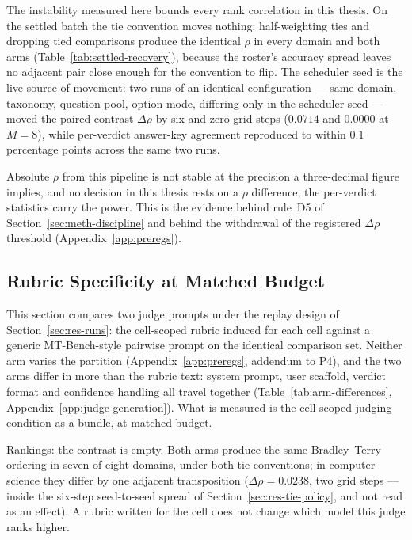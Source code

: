 The instability measured here bounds every rank correlation in this
thesis. On the settled batch the tie convention moves nothing: half-weighting
ties and dropping tied comparisons produce the identical $\rho$ in
every domain and both arms (Table~\ref{tab:settled-recovery}), because
the roster's accuracy spread leaves no adjacent pair close enough for
the convention to flip. The scheduler seed is the live source of
movement: two runs of an identical configuration --- same domain,
taxonomy, question pool, option mode, differing only in the scheduler
seed --- moved the paired contrast $\Delta\rho$ by six and zero grid
steps ($0.0714$ and $0.0000$ at $M = 8$), while per-verdict answer-key
agreement reproduced to within $0.1$ percentage points across the same
two runs.

Absolute $\rho$ from this pipeline is not stable at
the precision a three-decimal figure implies, and no decision in this
thesis rests on a $\rho$ difference; the per-verdict statistics carry
the power. This is the evidence behind rule~D5 of
Section~\ref{sec:meth-discipline} and behind the withdrawal of the
registered $\Delta\rho$ threshold
(Appendix~\ref{app:preregs}).

\subsection{Rubric Specificity at Matched Budget}\label{sec:res-c5}


This section compares two judge prompts under the replay design of
Section~\ref{sec:res-runs}: the cell-scoped rubric induced for each
cell against a generic MT-Bench-style pairwise prompt on the identical
comparison set. Neither arm varies the partition
(Appendix~\ref{app:preregs}, addendum to P4), and the two arms differ
in more than the rubric text: system prompt, user scaffold, verdict
format and confidence handling all travel together
(Table~\ref{tab:arm-differences},
Appendix~\ref{app:judge-generation}). What is measured is the
cell-scoped judging condition as a bundle, at matched budget.

Rankings: the contrast is empty. Both arms produce
the same Bradley--Terry ordering in seven of eight domains, under
both tie conventions; in computer science they differ by one adjacent
transposition ($\Delta\rho = 0.0238$, two grid steps --- inside the
six-step seed-to-seed spread of
Section~\ref{sec:res-tie-policy}, and not read as an effect). A
rubric written for the cell does not change which model this judge
ranks higher.

